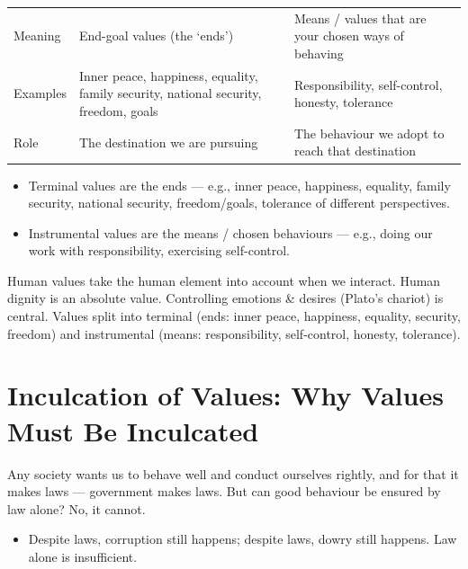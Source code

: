 \begin{center}
\begin{tabularx}{\textwidth}{>{\raggedright\arraybackslash}p{2.9cm} Y Y}
 &  &  \\
\toprule
Meaning & End-goal values (the `ends') & Means / values that are your chosen ways of behaving \\
Examples & Inner peace, happiness, equality, family security, national security, freedom, goals & Responsibility, self-control, honesty, tolerance \\
Role & The destination we are pursuing & The behaviour we adopt to reach that destination \\
\bottomrule
\end{tabularx}
\end{center}

\begin{itemize}
\item Terminal values are the ends --- e.g., inner peace, happiness, equality, family security, national security, freedom/goals, tolerance of different perspectives.
\item Instrumental values are the means / chosen behaviours --- e.g., doing our work with responsibility, exercising self-control.
\end{itemize}

\begin{QuickRevision}
Human values take the human element into account when we interact. Human dignity is an absolute value. Controlling emotions \& desires (Plato's chariot) is central. Values split into terminal (ends: inner peace, happiness, equality, security, freedom) and instrumental (means: responsibility, self-control, honesty, tolerance).
\end{QuickRevision}

\section{Inculcation of Values: Why Values Must Be Inculcated}

Any society wants us to behave well and conduct ourselves rightly, and for that it makes laws --- government makes laws. But can good behaviour be ensured by law alone? No, it cannot.

\begin{itemize}
\item Despite laws, corruption still happens; despite laws, dowry still happens. Law alone is insufficient.
\end{itemize}

